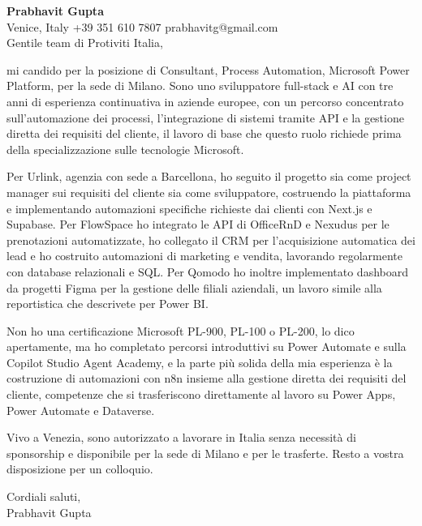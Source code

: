 \documentclass[a4paper,10.5pt]{article}
\begin{document}
\textbf{Prabhavit Gupta}\\
Venice, Italy \textbar{} +39 351 610 7807 \textbar{} prabhavitg@gmail.com\\[10pt]
Gentile team di Protiviti Italia,

mi candido per la posizione di Consultant, Process Automation, Microsoft Power Platform, per la sede di Milano. Sono uno sviluppatore full-stack e AI con tre anni di esperienza continuativa in aziende europee, con un percorso concentrato sull'automazione dei processi, l'integrazione di sistemi tramite API e la gestione diretta dei requisiti del cliente, il lavoro di base che questo ruolo richiede prima della specializzazione sulle tecnologie Microsoft.

Per Urlink, agenzia con sede a Barcellona, ho seguito il progetto sia come project manager sui requisiti del cliente sia come sviluppatore, costruendo la piattaforma e implementando automazioni specifiche richieste dai clienti con Next.js e Supabase. Per FlowSpace ho integrato le API di OfficeRnD e Nexudus per le prenotazioni automatizzate, ho collegato il CRM per l'acquisizione automatica dei lead e ho costruito automazioni di marketing e vendita, lavorando regolarmente con database relazionali e SQL. Per Qomodo ho inoltre implementato dashboard da progetti Figma per la gestione delle filiali aziendali, un lavoro simile alla reportistica che descrivete per Power BI.

Non ho una certificazione Microsoft PL-900, PL-100 o PL-200, lo dico apertamente, ma ho completato percorsi introduttivi su Power Automate e sulla Copilot Studio Agent Academy, e la parte più solida della mia esperienza è la costruzione di automazioni con n8n insieme alla gestione diretta dei requisiti del cliente, competenze che si trasferiscono direttamente al lavoro su Power Apps, Power Automate e Dataverse.

Vivo a Venezia, sono autorizzato a lavorare in Italia senza necessità di sponsorship e disponibile per la sede di Milano e per le trasferte. Resto a vostra disposizione per un colloquio.

Cordiali saluti,\\
Prabhavit Gupta
\end{document}
